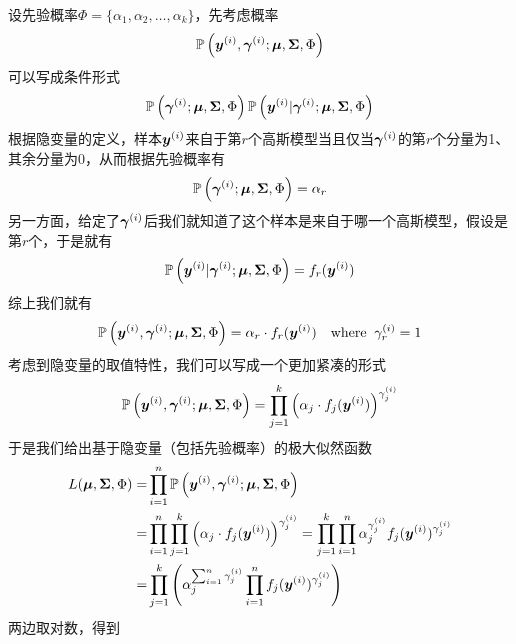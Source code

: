 \documentclass[a4paper,UTF8]{article}
\begin{document}
设先验概率\(\Phi=\{\alpha_1,\alpha_2,\dotsc,\alpha_k\}\)，先考虑概率\begin{equation*}
    \mathbb{P}\left(\boldsymbol{y}^{(i)},\boldsymbol{\gamma}^{(i)};\boldsymbol{\mu},\boldsymbol{\Sigma},\Phi\right)
\end{equation*}可以写成条件形式\begin{equation*}
    \mathbb{P}\left(\boldsymbol{\gamma}^{(i)};\boldsymbol{\mu},\boldsymbol{\Sigma},\Phi\right)\mathbb{P}\left(\boldsymbol{y}^{(i)}|\boldsymbol{\gamma}^{(i)};\boldsymbol{\mu},\boldsymbol{\Sigma},\Phi\right)
\end{equation*}根据隐变量的定义，样本\(\boldsymbol{y}^{(i)}\)来自于第\(r\)个高斯模型当且仅当\(\boldsymbol{\gamma}^{(i)}\)的第\(r\)个分量为1、其余分量为0，从而根据先验概率有\[\mathbb{P}\left(\boldsymbol{\gamma}^{(i)};\boldsymbol{\mu},\boldsymbol{\Sigma},\Phi\right)=\alpha_r\]另一方面，给定了\(\boldsymbol{\gamma}^{(i)}\)后我们就知道了这个样本是来自于哪一个高斯模型，假设是第\(r\)个，于是就有\[
    \mathbb{P}\left(\boldsymbol{y}^{(i)}|\boldsymbol{\gamma}^{(i)};\boldsymbol{\mu},\boldsymbol{\Sigma},\Phi\right)=f_r(\boldsymbol{y}^{(i)})
\]综上我们就有\begin{equation*}
    \mathbb{P}\left(\boldsymbol{y}^{(i)},\boldsymbol{\gamma}^{(i)};\boldsymbol{\mu},\boldsymbol{\Sigma},\Phi\right)=\alpha_r\cdot f_r(\boldsymbol{y}^{(i)})\quad \mathrm{where}\;\;\gamma^{(i)}_r=1
\end{equation*}考虑到隐变量的取值特性，我们可以写成一个更加紧凑的形式\begin{equation}
    \mathbb{P}\left(\boldsymbol{y}^{(i)},\boldsymbol{\gamma}^{(i)};\boldsymbol{\mu},\boldsymbol{\Sigma},\Phi\right)=\prod_{j=1}^k \left(\alpha_j\cdot f_j(\boldsymbol{y}^{(i)})\right)^{\gamma^{(i)}_j}
\end{equation}于是我们给出基于隐变量（包括先验概率）的极大似然函数\begin{equation}
    \begin{split}
        L(\boldsymbol{\mu},\boldsymbol{\Sigma},\Phi)
        =&\prod_{i=1}^n\mathbb{P}\left(\boldsymbol{y}^{(i)},\boldsymbol{\gamma}^{(i)};\boldsymbol{\mu},\boldsymbol{\Sigma},\Phi\right)\\
        =&\prod_{i=1}^n\prod_{j=1}^k \left(\alpha_j\cdot f_j(\boldsymbol{y}^{(i)})\right)^{\gamma^{(i)}_j}
        =\prod_{j=1}^k\prod_{i=1}^n\alpha^{\gamma^{(i)}_j}_j f_j(\boldsymbol{y}^{(i)})^{\gamma^{(i)}_j}\\
        =&\prod_{j=1}^k\left(
            \alpha_j^{\sum_{i=1}^n\gamma_j^{(i)}}\prod_{i=1}^nf_j(\boldsymbol{y}^{(i)})^{\gamma^{(i)}_j}
        \right)
    \end{split}
\end{equation}两边取对数，得到\begin{equation}\label{eq:lnmle}

\end{equation}
\end{document}
